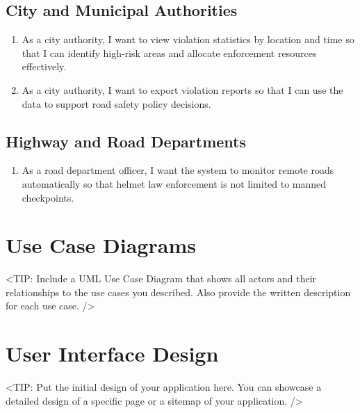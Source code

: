 \subsection{City and Municipal Authorities}

\begin{enumerate}[leftmargin=80pt]
    \item As a city authority, I want to view violation statistics by location and time so that I can identify high-risk areas and allocate enforcement resources effectively.
    \item As a city authority, I want to export violation reports so that I can use the data to support road safety policy decisions.
\end{enumerate}

\subsection{Highway and Road Departments}

\begin{enumerate}[leftmargin=80pt]
    \item As a road department officer, I want the system to monitor remote roads automatically so that helmet law enforcement is not limited to manned checkpoints.
\end{enumerate}

\section{Use Case Diagrams}
\label{section:use-case-diagrams}
<TIP: Include a UML Use Case Diagram that shows all actors and
their relationships to the use cases you described.
Also provide the written description for each use case. />

\section{User Interface Design}
\label{section:user-interface-design}
<TIP: Put the initial design of your application here. You can
showcase a detailed design of a specific page or a sitemap of your application. />
